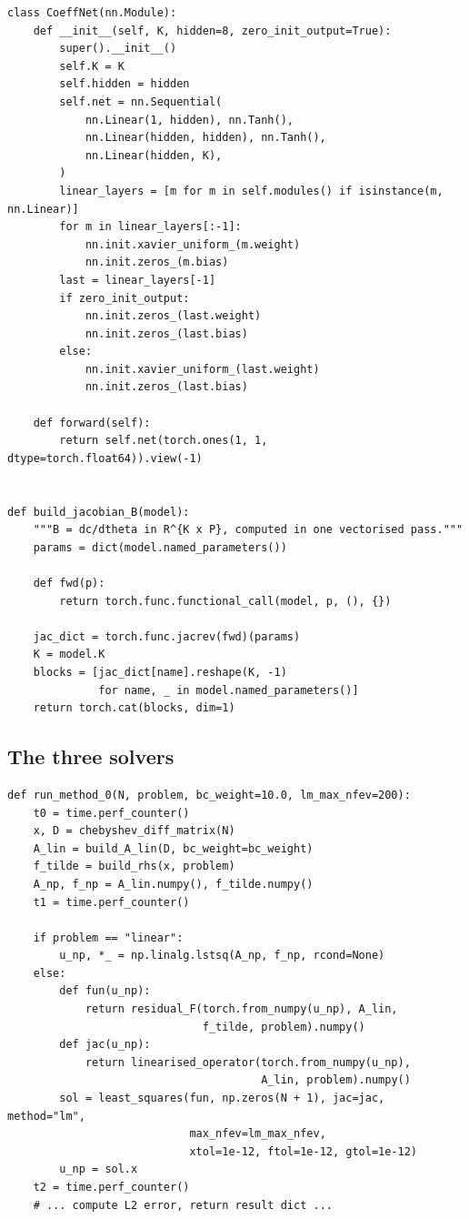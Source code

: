 \documentclass[11pt,a4paper]{article}
\begin{document}
\begin{lstlisting}[caption={MLP for $c(\theta)$ and vectorised Jacobian via \texttt{torch.func.jacrev}.},label={lst:net}]
class CoeffNet(nn.Module):
    def __init__(self, K, hidden=8, zero_init_output=True):
        super().__init__()
        self.K = K
        self.hidden = hidden
        self.net = nn.Sequential(
            nn.Linear(1, hidden), nn.Tanh(),
            nn.Linear(hidden, hidden), nn.Tanh(),
            nn.Linear(hidden, K),
        )
        linear_layers = [m for m in self.modules() if isinstance(m, nn.Linear)]
        for m in linear_layers[:-1]:
            nn.init.xavier_uniform_(m.weight)
            nn.init.zeros_(m.bias)
        last = linear_layers[-1]
        if zero_init_output:
            nn.init.zeros_(last.weight)
            nn.init.zeros_(last.bias)
        else:
            nn.init.xavier_uniform_(last.weight)
            nn.init.zeros_(last.bias)

    def forward(self):
        return self.net(torch.ones(1, 1, dtype=torch.float64)).view(-1)


def build_jacobian_B(model):
    """B = dc/dtheta in R^{K x P}, computed in one vectorised pass."""
    params = dict(model.named_parameters())

    def fwd(p):
        return torch.func.functional_call(model, p, (), {})

    jac_dict = torch.func.jacrev(fwd)(params)
    K = model.K
    blocks = [jac_dict[name].reshape(K, -1)
              for name, _ in model.named_parameters()]
    return torch.cat(blocks, dim=1)
\end{lstlisting}

\subsection{The three solvers}

\begin{lstlisting}[caption={Method 0: dense baseline (linear via \texttt{lstsq}, nonlinear via SciPy LM with analytic Jacobian).},label={lst:m0}]
def run_method_0(N, problem, bc_weight=10.0, lm_max_nfev=200):
    t0 = time.perf_counter()
    x, D = chebyshev_diff_matrix(N)
    A_lin = build_A_lin(D, bc_weight=bc_weight)
    f_tilde = build_rhs(x, problem)
    A_np, f_np = A_lin.numpy(), f_tilde.numpy()
    t1 = time.perf_counter()

    if problem == "linear":
        u_np, *_ = np.linalg.lstsq(A_np, f_np, rcond=None)
    else:
        def fun(u_np):
            return residual_F(torch.from_numpy(u_np), A_lin,
                              f_tilde, problem).numpy()
        def jac(u_np):
            return linearised_operator(torch.from_numpy(u_np),
                                       A_lin, problem).numpy()
        sol = least_squares(fun, np.zeros(N + 1), jac=jac, method="lm",
                            max_nfev=lm_max_nfev,
                            xtol=1e-12, ftol=1e-12, gtol=1e-12)
        u_np = sol.x
    t2 = time.perf_counter()
    # ... compute L2 error, return result dict ...
\end{lstlisting}
\end{document}
